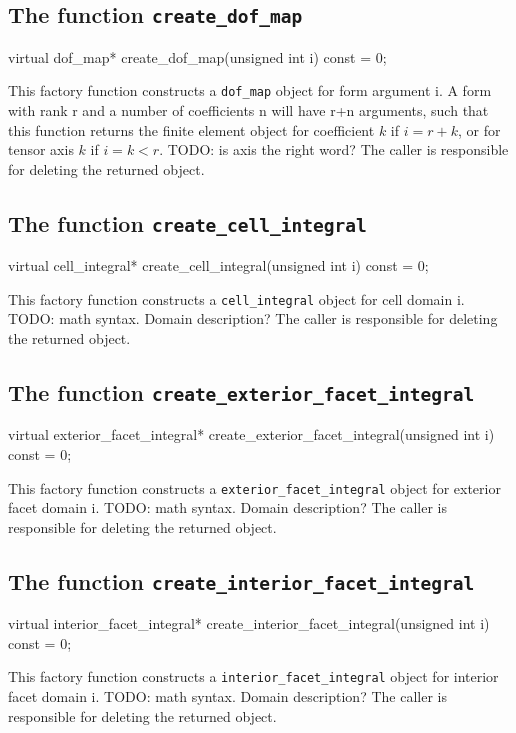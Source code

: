 \subsection{The function \texttt{create\_dof\_map}}

\begin{code}
virtual dof_map* create_dof_map(unsigned int i) const = 0;
\end{code}

This factory function constructs a \texttt{dof\_map} object for form argument i.
A form with rank r and a number of coefficients n will have r+n arguments,
such that this function returns the finite element object for coefficient $k$ if $i=r+k$,
or for tensor axis $k$ if $i=k<r$. TODO: is axis the right word?
The caller is responsible for deleting the returned object.

\subsection{The function \texttt{create\_cell\_integral}}

\begin{code}
virtual cell_integral* create_cell_integral(unsigned int i) const = 0;
\end{code}

This factory function constructs a \texttt{cell\_integral} object for cell domain i.
TODO: math syntax. Domain description?
The caller is responsible for deleting the returned object.

\subsection{The function \texttt{create\_exterior\_facet\_integral}}

\begin{code}
virtual exterior_facet_integral* create_exterior_facet_integral(unsigned int i) const = 0;
\end{code}

This factory function constructs a \texttt{exterior\_facet\_integral} object for exterior facet domain i.
TODO: math syntax. Domain description?
The caller is responsible for deleting the returned object.

\subsection{The function \texttt{create\_interior\_facet\_integral}}

\begin{code}
virtual interior_facet_integral* create_interior_facet_integral(unsigned int i) const = 0;
\end{code}

This factory function constructs a \texttt{interior\_facet\_integral} object for interior facet domain i.
TODO: math syntax. Domain description?
The caller is responsible for deleting the returned object.

